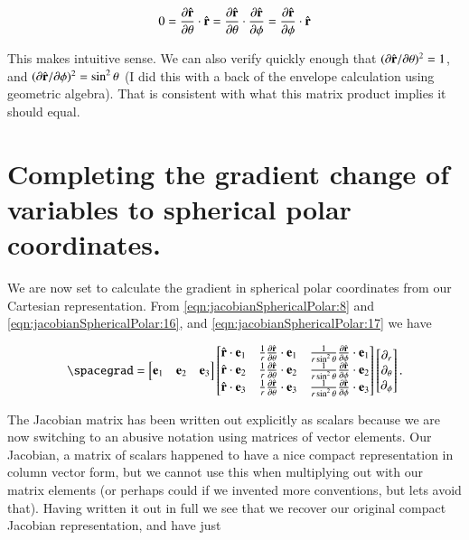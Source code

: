 \begin{align}\label{eqn:jacobianSphericalPolar:19}
0 = \frac{\partial {\hat{\mathbf{r}}}}{\partial {\theta}} \cdot \hat{\mathbf{r}} = \frac{\partial {\hat{\mathbf{r}}}}{\partial {\theta}} \cdot \frac{\partial {\hat{\mathbf{r}}}}{\partial {\phi}} = \frac{\partial {\hat{\mathbf{r}}}}{\partial {\phi}} \cdot \hat{\mathbf{r}} 
\end{align}

This makes intuitive sense.  We can also verify quickly enough that $({\partial {\hat{\mathbf{r}}}}/{\partial {\theta}})^2 = 1$, and $({\partial {\hat{\mathbf{r}}}}/{\partial {\phi}})^2 = \sin^2\theta$ (I did this with a back of the envelope calculation using geometric algebra).  That is consistent with what this matrix product implies it should equal.

\section{Completing the gradient change of variables to spherical polar coordinates.}

We are now set to calculate the gradient in spherical polar coordinates from our Cartesian representation.  From \ref{eqn:jacobianSphericalPolar:8} and
\ref{eqn:jacobianSphericalPolar:16}, and \ref{eqn:jacobianSphericalPolar:17} we have

\begin{align}\label{eqn:jacobianSphericalPolar:20}
\spacegrad =
\begin{bmatrix}
\Be_1 & \Be_2 & \Be_3  
\end{bmatrix}
\begin{bmatrix}
\rcap \cdot \Be_1 & \inv{r} \PD{\theta}{\rcap} \cdot \Be_1 & \inv{r \sin^2\theta} \PD{\phi}{\rcap} \cdot \Be_1 \\
\rcap \cdot \Be_2 & \inv{r} \PD{\theta}{\rcap} \cdot \Be_2 & \inv{r \sin^2\theta} \PD{\phi}{\rcap} \cdot \Be_2 \\
\rcap \cdot \Be_3 & \inv{r} \PD{\theta}{\rcap} \cdot \Be_3 & \inv{r \sin^2\theta} \PD{\phi}{\rcap} \cdot \Be_3 
\end{bmatrix}
\begin{bmatrix}
\partial_r \\
\partial_\theta \\
\partial_\phi
\end{bmatrix}.
\end{align}

The Jacobian matrix has been written out explicitly as scalars because we are now switching to an abusive notation using matrices of vector elements.  Our Jacobian, a matrix of scalars happened to have a nice compact representation in column vector form, but we cannot use this when multiplying out with our matrix elements (or perhaps could if we invented more conventions, but lets avoid that).  Having written it out in full we see that we recover our original compact Jacobian representation, and have just

